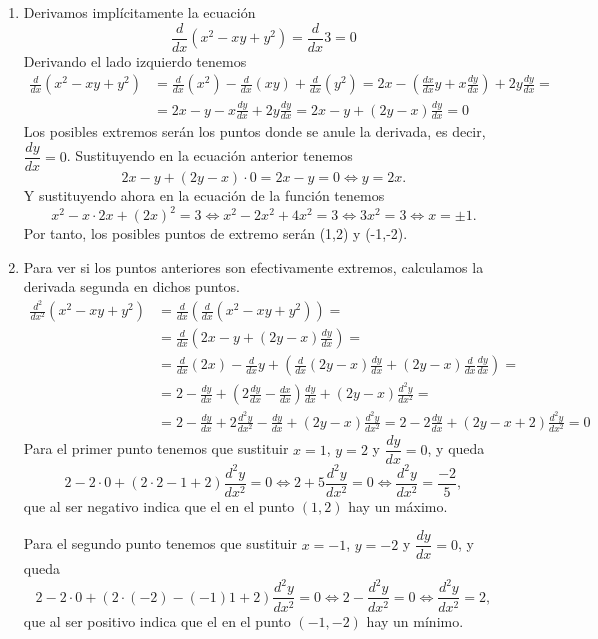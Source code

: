 {\begin{enumerate}
\item Derivamos implícitamente la ecuación
\[
\frac{d}{dx}(x^2-xy+y^2)=\frac{d}{dx}3=0
\]
Derivando el lado izquierdo tenemos
\begin{align*}
\frac{d}{dx}(x^2-xy+y^2)&=
\frac{d}{dx}(x^2)-\frac{d}{dx}(xy)+\frac{d}{dx}(y^2)=
2x-(\frac{dx}{dx}y+x\frac{dy}{dx})+2y\frac{dy}{dx}=\\
&=2x-y-x\frac{dy}{dx}+2y\frac{dy}{dx}
=2x-y+(2y-x)\frac{dy}{dx}=0
\end{align*}
Los posibles extremos serán los puntos donde se anule la derivada, es decir, $\dfrac{dy}{dx}=0$. Sustituyendo en la ecuación anterior tenemos
\[
2x-y+(2y-x)\cdot 0= 2x-y=0 \Leftrightarrow y=2x.
\]
Y sustituyendo ahora en la ecuación de la función tenemos
\[
x^2-x\cdot 2x+(2x)^2=3 \Leftrightarrow x^2-2x^2+4x^2=3 \Leftrightarrow 3x^2=3 \Leftrightarrow x=\pm1.
\]
Por tanto, los posibles puntos de extremo serán (1,2) y (-1,-2).

\item Para ver si los puntos anteriores son efectivamente extremos, calculamos la derivada segunda en dichos puntos.
\begin{align*}
\frac{d^2}{dx^2}(x^2-xy+y^2)&=
\frac{d}{dx}\left(\frac{d}{dx}(x^2-xy+y^2)\right)=\\
&=\frac{d}{dx}\left(2x-y+(2y-x)\frac{dy}{dx}\right)=\\
&=\frac{d}{dx}(2x)-\frac{d}{dx}y+\left(\frac{d}{dx}(2y-x)\frac{dy}{dx}+(2y-x)\frac{d}{dx}\frac{dy}{dx}\right)=\\
&=2-\frac{dy}{dx}+\left(2\frac{dy}{dx}-\frac{dx}{dx}\right)\frac{dy}{dx}+(2y-x)\frac{d^2y}{dx^2}=\\
&= 2-\frac{dy}{dx}+2\frac{d^2y}{dx^2}-\frac{dy}{dx}+(2y-x)\frac{d^2y}{dx^2}=
2-2\frac{dy}{dx}+(2y-x+2)\frac{d^2y}{dx^2}=0
\end{align*}
Para el primer punto tenemos que sustituir $x=1$, $y=2$ y $\dfrac{dy}{dx}=0$, y queda
\[
2-2\cdot 0+(2\cdot 2-1+2)\frac{d^2y}{dx^2}=0 \Leftrightarrow 2+5\frac{d^2y}{dx^2}=0 \Leftrightarrow \frac{d^2y}{dx^2}=\frac{-2}{5},
\]
que al ser negativo indica que el en el punto $(1,2)$ hay un máximo.

Para el segundo punto tenemos que sustituir $x=-1$, $y=-2$ y $\dfrac{dy}{dx}=0$, y queda
\[
2-2\cdot 0+(2\cdot (-2)-(-1)1+2)\frac{d^2y}{dx^2}=0 \Leftrightarrow 2-\frac{d^2y}{dx^2}=0 \Leftrightarrow \frac{d^2y}{dx^2}=2,
\]
que al ser positivo indica que el en el punto $(-1,-2)$ hay un mínimo.
\end{enumerate}
}


